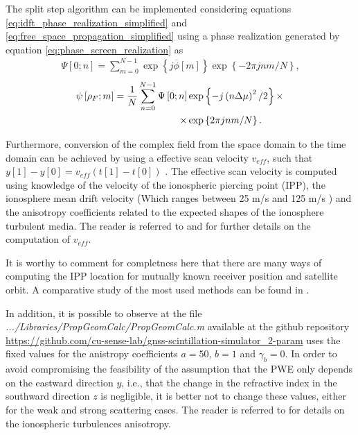 The split step algorithm can be implemented considering equations \eqref{eq:idft_phase_realization_simplified} and \eqref{eq:free_space_propagation_simplified} using a phase realization generated by equation \eqref{eq:phase_screen_realization} as \cite[Equations 9 and 10]{JiaoScintillationOnGPSSignalsForDynamicPlatforms2018}
\begin{align}
    \label{eq:idft_phase_realization_simplified}
    \Psi\left[ 0; n \right] = \sum^{N-1}_{m=0}{\exp\left\{ j \overline{\phi}\left[ m \right] \right\} \exp\left\{ -2\pi j n m / N \right\}} \text{,}
\end{align}
\begin{align}
    \label{eq:post-prop_scint_field}
    \psi\left[ \rho_F; m \right] = \frac{1}{N} \sum_{n=0}^{N-1} \Psi\left[ 0; n \right]
    & \exp \left\{ -j\left( n\Delta \mu \right)^2 /2 \right\} \times \notag \\
    \times & \exp \left\{ 2\pi j n m /N \right\} \text{.}
\end{align}

Furthermore, conversion of the complex field from the space domain to the time domain can be achieved by using a effective scan velocity $v_{eff}$, such that $y\left[ 1 \right] - y\left[ 0 \right] = v_{eff} \left( t\left[ 1 \right] - t\left[ 0 \right] \right)$ \cite[Equation 11]{JiaoMultifrequencyScintillationOnGPSSignalsStaticPlatforms2018}. The effective scan velocity is computed using knowledge of the velocity of the ionospheric piercing point (IPP), the ionosphere mean drift velocity (Which ranges between 25 m/s and 125 m/s \cite{SizeShapeOrientationOfEquatorialAnomalyScintillations} \cite{Wang2017IonoDriftHighLatitude}) and the anisotropy coefficients related to the expected shapes of the ionosphere turbulent media. The reader is referred to \cite[Section 4]{JiaoScintillationOnGPSSignalsForDynamicPlatforms2018} and \cite[Chapter 4]{rinoTheoryScintillationApplications2011} for further details on the computation of $v_{eff}$.

It is worthy to comment for completness here that there are many ways of computing the IPP location for mutually known receiver position and satellite orbit. A comparative study of the most used methods can be found in \cite{Prol2017_Comparative_Study}. 

In addition, it is possible to observe at the file \textit{.../Libraries/PropGeomCalc/PropGeomCalc.m} available at the github repository \url{https://github.com/cu-sense-lab/gnss-scintillation-simulator_2-param} uses the fixed values for the anistropy coefficients $a=50$, $b=1$ and $\gamma_b = 0$. In order to avoid compromising the feasibility of the assumption that the PWE only depends on the eastward direction $y$, i.e., that the change in the refractive index in the southward direction $z$ is negligible, it is better not to change these values, either for the weak and strong scattering cases. The reader is referred to \cite{Vasylyev2024WeakScatterAnisotropy} for details on the ionospheric turbulences anisotropy. 

